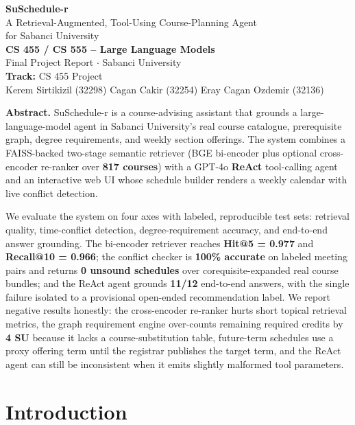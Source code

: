 \documentclass[10pt,letterpaper]{article}
\begin{document}
\begin{center}
  {\Huge\bfseries\color{suNavy} SuSchedule-r}\\[4pt]
  {\Large A Retrieval-Augmented, Tool-Using Course-Planning Agent}\\[-1pt]
  {\Large for Sabanci University}\\[10pt]
  {\bfseries CS 455 / CS 555 -- Large Language Models}\\
  Final Project Report \(\cdot\) Sabanci University\\[8pt]
  \textbf{Track:} CS 455 Project\\[4pt]
  Kerem Sirtikizil (32298) \quad
  Cagan Cakir (32254) \quad
  Eray Cagan Ozdemir (32136)
\end{center}

\begin{summarybox}
\textbf{Abstract.}
SuSchedule-r is a course-advising assistant that grounds a large-language-model agent in Sabanci University's real course catalogue, prerequisite graph, degree requirements, and weekly section offerings. The system combines a FAISS-backed two-stage semantic retriever (BGE bi-encoder plus optional cross-encoder re-ranker over \textbf{817 courses}) with a GPT-4o \textbf{ReAct} tool-calling agent and an interactive web UI whose schedule builder renders a weekly calendar with live conflict detection.

We evaluate the system on four axes with labeled, reproducible test sets: retrieval quality, time-conflict detection, degree-requirement accuracy, and end-to-end answer grounding. The bi-encoder retriever reaches \textbf{Hit@5 = 0.977} and \textbf{Recall@10 = 0.966}; the conflict checker is \textbf{100\% accurate} on labeled meeting pairs and returns \textbf{0 unsound schedules} over corequisite-expanded real course bundles; and the ReAct agent grounds \textbf{11/12} end-to-end answers, with the single failure isolated to a provisional open-ended recommendation label. We report negative results honestly: the cross-encoder re-ranker hurts short topical retrieval metrics, the graph requirement engine over-counts remaining required credits by \textbf{4 SU} because it lacks a course-substitution table, future-term schedules use a proxy offering term until the registrar publishes the target term, and the ReAct agent can still be inconsistent when it emits slightly malformed tool parameters.
\end{summarybox}

\section{Introduction}
\end{document}
